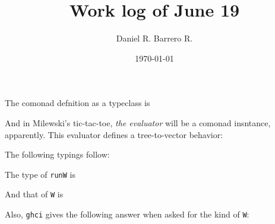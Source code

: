 \documentclass{amsart}
\title{Work log of June 19}
\author{Daniel R. Barrero R.}
\date{\today}
\begin{document}
\maketitle

\section{}

The comonad defnition as a typeclass is



And in Milewski's tic-tac-toe, \emph{the evaluator} will be a comonad insntance,
apparently. This evaluator defines a tree-to-vector behavior:



The following typings follow:

\bigskip

The type of \texttt{runW} is



And that of \texttt{W} is



Also, \texttt{ghci} gives the following answer when asked for the kind of
\texttt{W}:


\end{document}
